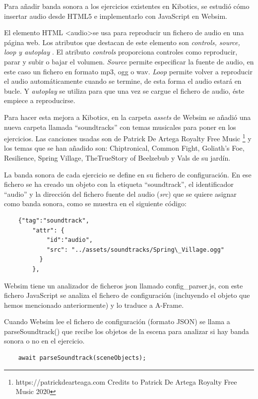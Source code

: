 Para añadir banda sonora a los ejercicios existentes en Kibotics, se estudió cómo insertar audio desde HTML5 e implementarlo con JavaScript en Websim.

El elemento HTML \textless audio\textgreater  se usa para reproducir un fichero de audio en una página web.
Los atributos que destacan de este elemento son \textit{controls, source, loop y autoplay }.
El atributo \textit{controls} proporciona controles como reproducir, parar y subir o bajar el volumen.
 \textit{Source} permite especificar la fuente de audio, en este caso un fichero en formato mp3, ogg o wav. \textit{Loop} permite volver a reproducir el audio automáticamente cuando se termine, de esta forma  el audio estará en bucle. Y \textit{autoplay} se utiliza para que una vez se cargue el fichero de audio, éste empiece a reproducirse.

Para hacer esta mejora a Kibotics, en la carpeta \textit{assets} de Websim se añadió una nueva carpeta llamada ``soundtracks'' con temas musicales para poner en los ejercicios. Las canciones usadas son de Patrick De Artega Royalty Free Music  \footnote{ https://patrickdearteaga.com Credits to Patrick De Artega Royalty Free Music 2020}
y los temas que se han añadido son:
Chiptronical, Common Fight, Goliath's Foe, Resilience, Spring Village, TheTrueStory of Beelzebub y Vals de su jardín.


La banda sonora de cada ejercicio se define en su fichero de configuración. En ese fichero se ha creado un objeto con la etiqueta ``soundtrack'', el identificador ``audio'' y la dirección del fichero fuente del audio (\textit{src}) que se quiere asignar como banda sonora, como se muestra en el siguiente código:

\begin{lstlisting}
 	{"tag":"soundtrack",
        "attr": {
            "id":"audio",
            "src": "../assets/soundtracks/Spring\_Village.ogg"
          }
        },
   \end{lstlisting}

Websim tiene un analizador de ficheros json llamado config\_parser.js, con este fichero JavaScript se analiza el fichero de configuración (incluyendo el objeto que hemos mencionado anteriormente) y lo traduce a A-Frame.

Cuando Websim lee el fichero de configuración (formato JSON) se llama a parseSoundtrack() que recibe los objetos de la escena para analizar si hay banda sonora o no en el ejercicio.

\begin{lstlisting}
 	await parseSoundtrack(sceneObjects);
\end{lstlisting}

